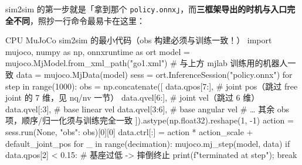 \begin{note}
sim2sim 的第一步就是「拿到那个 \verb|policy.onnx|」，而\textbf{三框架导出的时机与入口完全不同}，照抄一行命令最易卡在这里：
\end{note}

\begin{codebox}[Python]{CPU MuJoCo sim2sim 的最小代码（obs 构建必须与训练一致！）}
import mujoco, numpy as np, onnxruntime as ort
model = mujoco.MjModel.from_xml_path("go1.xml")   # 与上方 mjlab 训练用的机器人一致
data  = mujoco.MjData(model)
sess  = ort.InferenceSession("policy.onnx")
for step in range(1000):
    obs = np.concatenate([
        data.qpos[7:],   # joint pos（跳过 free joint 的 7 维，见 nq/nv 一节）
        data.qvel[6:],   # joint vel（跳过 6 维）
        data.qvel[:3],   # base linear vel
        data.qvel[3:6],  # base angular vel
        # … 其余 obs 项，顺序/归一化须与训练完全一致
    ]).astype(np.float32).reshape(1, -1)
    action = sess.run(None, {"obs": obs})[0][0]
    data.ctrl[:] = action * action_scale + default_joint_pos
    for _ in range(decimation):
        mujoco.mj_step(model, data)
    if data.qpos[2] < 0.15:           # 基座过低 -> 摔倒终止
        print(f"terminated at {step}"); break
\end{codebox}

